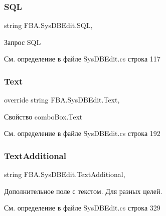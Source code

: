 \subsubsection{\texorpdfstring{S\+QL}{SQL}}
{\footnotesize\ttfamily string F\+B\+A.\+Sys\+D\+B\+Edit.\+S\+QL\hspace{0.3cm}{\ttfamily [get]}, {\ttfamily [set]}}



Запрос S\+QL 



См. определение в файле Sys\+D\+B\+Edit.\+cs строка 117

\mbox{\label{class_f_b_a_1_1_sys_d_b_edit_a5365a2a149bae1e99378b755df24951e}} 
\subsubsection{\texorpdfstring{Text}{Text}}
{\footnotesize\ttfamily override string F\+B\+A.\+Sys\+D\+B\+Edit.\+Text\hspace{0.3cm}{\ttfamily [get]}, {\ttfamily [set]}}



Свойство combo\+Box.\+Text 



См. определение в файле Sys\+D\+B\+Edit.\+cs строка 192

\mbox{\label{class_f_b_a_1_1_sys_d_b_edit_a75ea9d530622afa51e9dd7a6cb97c4c4}} 
\subsubsection{\texorpdfstring{Text\+Additional}{TextAdditional}}
{\footnotesize\ttfamily string F\+B\+A.\+Sys\+D\+B\+Edit.\+Text\+Additional\hspace{0.3cm}{\ttfamily [get]}, {\ttfamily [set]}}



Дополнительное поле с текстом. Для разных целей. 



См. определение в файле Sys\+D\+B\+Edit.\+cs строка 329

